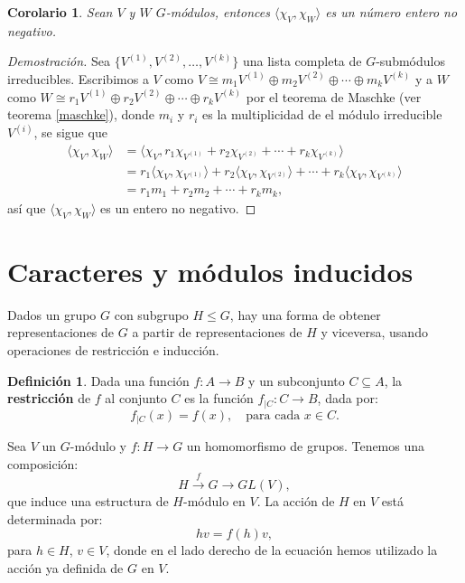 \documentclass[12pt]{book}
\newtheorem{corollary}[theorem]{Corolario}
\theoremstyle{definition}
\newtheorem{definition}[theorem]{Definición}
\newcounter{in}
\newcounter{ini}
\begin{document}
\begin{corollary}
  \label{prod-car-pos}
  Sean $V$ y $W$ $G$-módulos, entonces $\langle\chi_{V},\chi_{W}\rangle$ es un número entero no negativo.
\end{corollary}
\begin{proof}[Demostración]
  Sea $\{V^{(1)},V^{(2)},\ldots,V^{(k)}\}$ una lista completa de $G$-submódulos
  irreducibles. Escribimos a $V$ como $V\cong
  m_{1}V^{(1)}\oplus m_{2}V^{(2)}\oplus\cdots\oplus m_{k}V^{(k)}$ y a $W$ como $W\cong
  r_{1}V^{(1)}\oplus r_{2}V^{(2)}\oplus\cdots\oplus r_{k}V^{(k)}$ por el
  teorema de Maschke (ver teorema \ref{maschke}), donde $m_{i}$ y $r_{i}$ es la multiplicidad de el módulo
  irreducible $V^{(i)}$, se sigue que
  \begin{align*}
    \langle\chi_{V},\chi_{W}\rangle&=\langle\chi_{V},r_{1}\chi_{V^{(1)}}+r_{2}\chi_{V^{(2)}}+\cdots+r_{k}\chi_{V^{(k)}}\rangle\\
    &=r_{1}\langle\chi_{V},\chi_{V^{(1)}}\rangle+r_{2}\langle\chi_{V},\chi_{V^{(2)}}\rangle+\cdots+r_{k}\langle\chi_{V},\chi_{V^{(k)}}\rangle\\
    &=r_{1}m_{1}+r_{2}m_{2}+\cdots+r_{k}m_{k},
  \end{align*}
  así que  $\langle\chi_{V},\chi_{W}\rangle$ es un entero no
  negativo. 
\end{proof}

\section{Caracteres y módulos inducidos}
\label{carac-induc}

Dados un grupo $G$ con subgrupo $H\leq G$, hay una forma de obtener
representaciones de $G$ a partir de representaciones de $H$ y
viceversa, usando operaciones de
restricción e inducción.

\begin{definition}
  Dada una función $f:A\rightarrow B$ y un subconjunto $C\subseteq A$,
  la \textbf{restricción} de $f$ al conjunto $C$ es la función
  $f_{|C}:C\rightarrow B$, dada por: 
  \begin{equation*}
    \label{eq:restriccion}
    f_{|C}(x)=f(x), \quad\mbox{para cada } x \in C.
  \end{equation*}
\end{definition}

Sea $V$ un $G$-módulo y $f:H\rightarrow G$ un homomorfismo de
grupos. Tenemos una composición:
\begin{equation*}
  H\stackrel{f}{\rightarrow}G \rightarrow GL(V),
\end{equation*}
que induce una estructura de $H$-módulo en $V$. La acción de $H$ en
$V$ está determinada por:
\begin{equation*}
  hv=f(h)v,
\end{equation*}
para $h\in H$, $v\in V$, donde en el lado derecho de la ecuación hemos
utilizado la acción ya definida de $G$ en $V$. 
\end{document}
